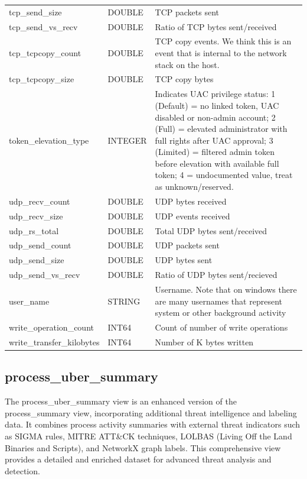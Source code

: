 \documentclass[conference,compsoc]{IEEEtran}
\begin{document}
\begin{longtable}{|p{5cm}|p{2cm}|p{9cm}|}
tcp\_send\_size & DOUBLE & TCP packets sent \\
tcp\_send\_vs\_recv & DOUBLE & Ratio of TCP bytes sent/received \\
tcp\_tcpcopy\_count & DOUBLE & TCP copy events. We think this is an event that is internal to the network stack on the host. \\
tcp\_tcpcopy\_size & DOUBLE & TCP copy bytes \\
token\_elevation\_type & INTEGER & Indicates UAC privilege status: 1 (Default) = no linked token, UAC disabled or non-admin account; 2 (Full) = elevated administrator with full rights after UAC approval; 3 (Limited) = filtered admin token before elevation with available full token; 4 = undocumented value, treat as unknown/reserved. \\
udp\_recv\_count & DOUBLE & UDP bytes received \\
udp\_recv\_size & DOUBLE & UDP events received \\
udp\_rs\_total & DOUBLE & Total UDP bytes sent/received \\
udp\_send\_count & DOUBLE & UDP packets sent \\
udp\_send\_size & DOUBLE & UDP bytes sent \\
udp\_send\_vs\_recv & DOUBLE & Ratio of UDP bytes sent/recieved \\
user\_name & STRING & Username. Note that on windows there are many usernames that represent system or other background activity \\
write\_operation\_count & INT64 & Count of number of write operations \\
write\_transfer\_kilobytes & INT64 & Number of K bytes written \\
\hline
\end{longtable}

\subsection{process\_uber\_summary}
\label{sec:process_uber_summary}

The process\_uber\_summary view is an enhanced version of the process\_summary view, incorporating additional threat intelligence and labeling data. It combines process activity summaries with external threat indicators such as SIGMA rules, MITRE ATT\&CK techniques, LOLBAS (Living Off the Land Binaries and Scripts), and NetworkX graph labels. This comprehensive view provides a detailed and enriched dataset for advanced threat analysis and detection.
\end{document}
